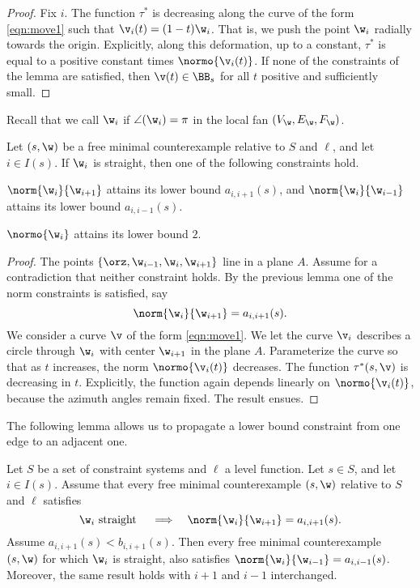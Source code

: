 \begin{proof} Fix $i$.  The function $\tau^*$ is decreasing along
the curve of the form \eqref{eqn:move1} such that
$\v_i(t)=(1-t) \w_i$.
That is, we push the point $\w_i$ radially towards the origin.
Explicitly, along this deformation, up to a constant, $\tau^*$ is equal
to a positive constant times $\normo{\v_i(t)}$.
If none of the constraints of the lemma are satisfied, then
$\v(t)\in \BB_s$ for all $t$ positive and sufficiently
small.
\end{proof}

Recall that we call $\w_i$ 
if $\angle(\w_i)=\pi$ in the local fan $(V_\w,E_\w,F_\w)$.

\begin{lemma} 
  Let $(s,\w)$ be a free minimal counterexample relative to $S$ and
  $\ell$,  and let $i\in I(s)$.  If $\w_i$ is straight, then one of the
  following constraints hold.
\item $\norm{\w_i}{\w_{i+1}}$ attains its lower bound $a_{i,i+1}(s)$, and
 $\norm{\w_i}{\w_{i-1}}$ attains its lower bound $a_{i,i-1}(s)$.
\item $\normo{\w_i}$ attains its lower bound $2$.
\end{lemma}

\begin{proof}  The points $\{\orz,\w_{i-1},\w_i,\w_{i+1}\}$ line in a plane $A$.
Assume for a contradiction that neither constraint holds.  By the previous
lemma one of the norm constraints is satisfied, say
\[
\norm{\w_i}{\w_{i+1}}=a_{i,i+1}(s).
\]
We consider a  curve $\v$ of the form \eqref{eqn:move1}.
We let the curve $\v_i$ describes a circle through
 $\w_i$ with center $\w_{i+1}$ in the plane $A$.  Parameterize the curve
so that as $t$ increases, the norm $\normo{\v_i(t)}$ decreases.
The function $\tau^*(s,\v)$ is decreasing in $t$.  Explicitly, the
function again depends linearly on $\normo{\v_i(t)}$, because
the azimuth angles remain fixed.  The result ensues.
\end{proof}

The following lemma allows us to propagate a lower bound constraint
from one edge to an adjacent one.

\begin{lemma} 
  Let $S$ be a set of constraint systems and $\ell$ a level
  function. Let $s\in S$, and let $i\in I(s)$.  Assume that every
  free minimal counterexample $(s,\w)$ relative to $S$ and $\ell$
  satisfies
\[
\w_i \text{ straight } \quad
\Longrightarrow\quad \norm{\w_i}{\w_{i+1}}=a_{i,i+1}(s).
\]
Assume $a_{i,i+1}(s)<b_{i,i+1}(s)$.
Then every free minimal counterexample $(s,\w)$
for which $\w_i$ is straight, also satisfies $\norm{\w_i}{\w_{i-1}}=a_{i,i-1}(s)$.
Moreover, the same result holds with $i+1$ and $i-1$ interchanged.
\end{lemma}

